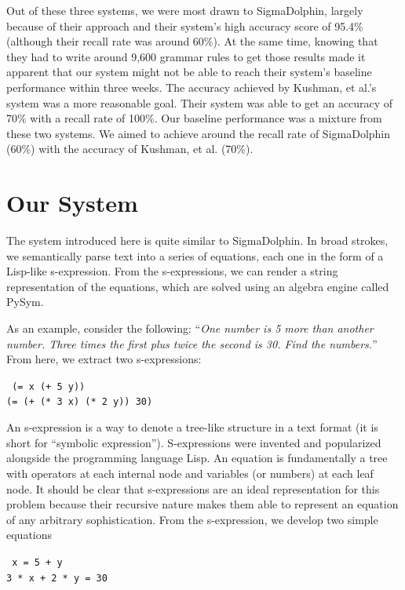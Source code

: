 \documentclass[11pt]{article}
\begin{document}
Out of these three systems, we were most drawn to SigmaDolphin, largely because of their approach and their system's high accuracy score of 95.4\% (although their recall rate was around 60\%). At the same time, knowing that they had to write around 9,600 grammar rules to get those results made it apparent that our system might not be able to reach their system's baseline performance within three weeks. The accuracy achieved by Kushman, et al.'s system was a more reasonable goal. Their system was able to get an accuracy of 70\% with a recall rate of 100\%. Our baseline performance was a mixture from these two systems. We aimed to achieve around the recall rate of SigmaDolphin (60\%) with the accuracy of Kushman, et al. (70\%).

\section{Our System}
The system introduced here is quite similar to SigmaDolphin. In broad strokes, we semantically parse text into a series of equations, each one in the form of a Lisp-like s-expression. From the s-expressions, we can render a string representation of the equations, which are solved using an algebra engine called PySym.

As an example, consider the following: ``\textit{One number is 5 more than another number. Three times the first plus twice the second is 30. Find the numbers.}'' From here, we extract two s-expressions:

\begin{center}
    \texttt{
(= x (+ 5 y))\\
(= (+ (* 3 x) (* 2 y)) 30)
    }
\end{center}

An s-expression is a way to denote a tree-like structure in a text format (it is short for ``symbolic expression''). S-expressions were invented and popularized alongside the programming language Lisp. An equation is fundamentally a tree with operators at each internal node and variables (or numbers) at each leaf node. It should be clear that s-expressions are an ideal representation for this problem because their recursive nature makes them able to represent an equation of any arbitrary sophistication. From the s-expression, we develop two simple equations

\begin{center}
    \texttt{
x = 5 + y\\
3 * x + 2 * y = 30
    }
\end{center}
\end{document}
